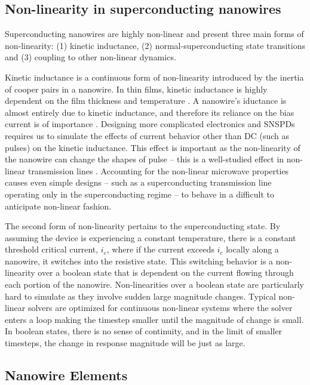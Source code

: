 \documentclass[]{article}
\begin{document}
\subsection{Non-linearity in superconducting nanowires}\label{nonlinearity}

Superconducting nanowires are highly non-linear and present three main forms of non-linearity:
(1) kinetic inductance, (2) normal-superconducting state transitions and
(3) coupling to other non-linear dynamics.

Kinetic inductance is a continuous form of non-linearity introduced by the inertia of cooper
pairs in a nanowire. In thin films, kinetic inductance is highly dependent on the film thickness
and temperature \cite{dizhu-thesis}. 
A nanowire's iductance is almost entirely due to kinetic inductance, and therefore
its reliance on the bias current is of importance \cite{kinetic_inductance_majority_of_nw}.
Designing more complicated electronics and SNSPDs  requires
us to simulate the effects of current behavior other than DC (such as pulses)
on the kinetic inductance. This effect is important as 
the non-linearity of the nanowire can change the shapes of pulse -- this is a well-studied effect in non-linear transmission lines \cite{nl_tline_reshape}. 
Accounting for the non-linear microwave properties causes even simple designs 
-- such as a superconducting transmission line operating only in the superconducting regime -- to 
behave in a difficult to anticipate non-linear fashion. 

The second form of non-linearity pertains to the superconducting state. By assuming the device is
experiencing a constant temperature, there is a constant threshold critical current,
$i_c$, where if the current exceeds $i_c$ locally along a nanowire, it switches into the resistive state. This switching behavior is a non-linearity
over a boolean state that is dependent on the current flowing through each portion of the nanowire.
Non-linearities over a boolean state are particularly hard to simulate as they involve sudden large
magnitude changes. Typical non-linear solvers are optimized for continuous non-linear systems where
the solver enters a loop making the timestep smaller until the magnitude of change is small.
In boolean states, there is no sense of continuity, and in the limit of smaller timesteps, the 
change in response magnitude will be just as large. 

\subsection{Nanowire Elements}
\end{document}
